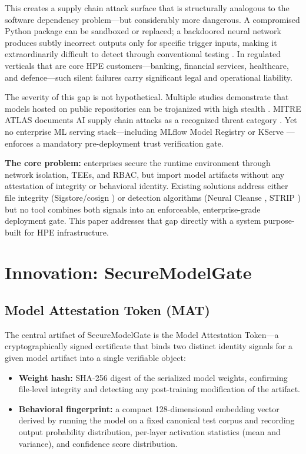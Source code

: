 \documentclass[10pt,twocolumn]{article}
\begin{document}
This creates a supply chain attack surface that is structurally analogous to
the software dependency problem---but considerably more dangerous. A compromised
Python package can be sandboxed or replaced; a backdoored neural network
produces subtly incorrect outputs only for specific trigger inputs, making it
extraordinarily difficult to detect through conventional testing
\cite{chen2017targeted, gu2019badnets}. In regulated verticals that are core
HPE customers---banking, financial services, healthcare, and defence---such
silent failures carry significant legal and operational liability.

The severity of this gap is not hypothetical. Multiple studies demonstrate that
models hosted on public repositories can be trojanized with high stealth
\cite{trojAI2021}. MITRE ATLAS documents AI supply chain attacks as a
recognized threat category \cite{mitre_atlas}. Yet no enterprise ML serving
stack---including MLflow Model Registry \cite{mlflow} or KServe
\cite{kserve}---enforces a mandatory pre-deployment trust verification gate.

\textbf{The core problem:} enterprises secure the runtime environment through
network isolation, TEEs, and RBAC, but import model artifacts without any
attestation of integrity or behavioral identity. Existing solutions address
either file integrity (Sigstore/cosign \cite{sigstore}) or detection algorithms
(Neural Cleanse \cite{wang2019neural}, STRIP \cite{gao2019strip}) but no tool
combines both signals into an enforceable, enterprise-grade deployment gate.
This paper addresses that gap directly with a system purpose-built for HPE
infrastructure.

\section{Innovation: SecureModelGate}

\subsection{Model Attestation Token (MAT)}

The central artifact of SecureModelGate is the Model Attestation Token---a
cryptographically signed certificate that binds two distinct identity signals
for a given model artifact into a single verifiable object:

\begin{itemize}
  \item \textbf{Weight hash:} SHA-256 digest of the serialized model weights,
        confirming file-level integrity and detecting any post-training
        modification of the artifact.
  \item \textbf{Behavioral fingerprint:} a compact 128-dimensional embedding
        vector derived by running the model on a fixed canonical test corpus and
        recording output probability distribution, per-layer activation
        statistics (mean and variance), and confidence score distribution.
\end{itemize}
\end{document}
